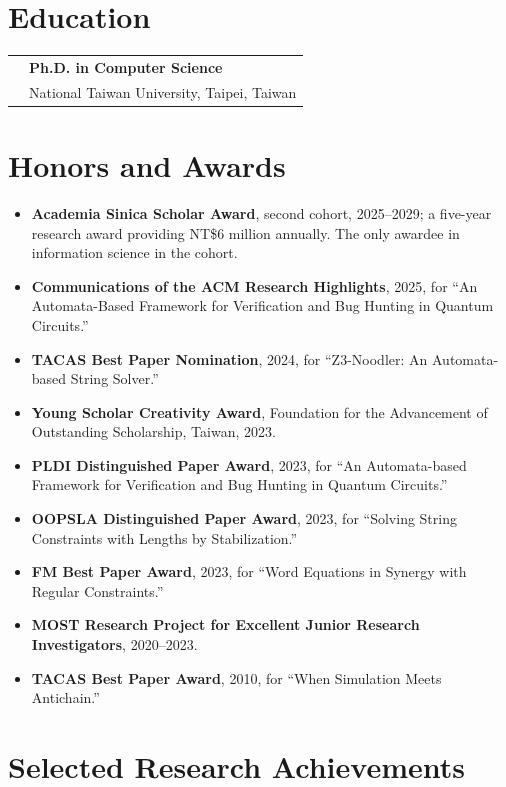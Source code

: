 \documentclass[11pt,a4paper]{article}
\makeatletter
\newcommand{\careerentry}[3]{%
  \begin{tabularx}{\textwidth}{@{}>{\raggedright\arraybackslash\color{muted}\sffamily}p{0.16\textwidth}%
    >{\raggedright\arraybackslash}X@{}}
  #1 & \textbf{#2}\\[-0.05em]
     & #3
  \end{tabularx}\vspace{0.55em}}
\newcommand{\award}[1]{\textbf{#1}}
\makeatother
\begin{document}
\section{Education}

\careerentry{2008}{Ph.D. in Computer Science}
  {National Taiwan University, Taipei, Taiwan}

\section{Honors and Awards}

\begin{itemize}
  \item \award{Academia Sinica Scholar Award}, second cohort, 2025--2029; a five-year research award providing NT\$6 million annually. The only awardee in information science in the cohort.
  \item \award{Communications of the ACM Research Highlights}, 2025, for ``An Automata-Based Framework for Verification and Bug Hunting in Quantum Circuits.''
  \item \award{TACAS Best Paper Nomination}, 2024, for ``Z3-Noodler: An Automata-based String Solver.''
  \item \award{Young Scholar Creativity Award}, Foundation for the Advancement of Outstanding Scholarship, Taiwan, 2023.
  \item \award{PLDI Distinguished Paper Award}, 2023, for ``An Automata-based Framework for Verification and Bug Hunting in Quantum Circuits.''
  \item \award{OOPSLA Distinguished Paper Award}, 2023, for ``Solving String Constraints with Lengths by Stabilization.''
  \item \award{FM Best Paper Award}, 2023, for ``Word Equations in Synergy with Regular Constraints.''
  \item \award{MOST Research Project for Excellent Junior Research Investigators}, 2020--2023.
  \item \award{TACAS Best Paper Award}, 2010, for ``When Simulation Meets Antichain.''
\end{itemize}

\section{Selected Research Achievements}
\end{document}
